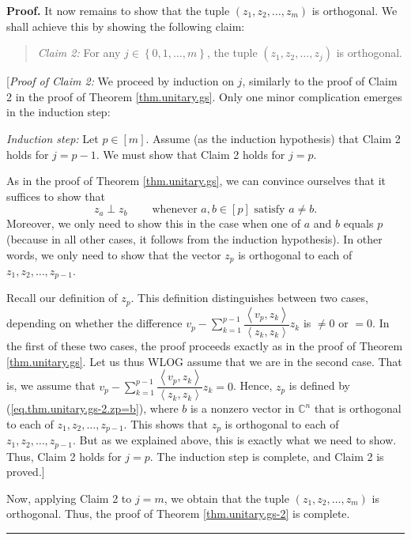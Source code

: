 \documentclass[numbers=enddot,12pt,final,onecolumn,notitlepage]{scrartcl}%
\numberwithin{exer}{subsection}
\theoremstyle{definition}
\newenvironment{statement}{\begin{quote}}{\end{quote}}
\newenvironment{proof}[1][Proof]{\noindent\textbf{#1.} }{\ \rule{0.5em}{0.5em}}
\let\sumnonlimits\sum
\renewcommand{\sum}{\sumnonlimits\limits}
\begin{document}
\begin{proof}
It now remains to show that the tuple $\left(  z_{1},z_{2},\ldots
,z_{m}\right)  $ is orthogonal. We shall achieve this by showing the following claim:

\begin{statement}
\textit{Claim 2:} For any $j\in\left\{  0,1,\ldots,m\right\}  $, the tuple
$\left(  z_{1},z_{2},\ldots,z_{j}\right)  $ is orthogonal.
\end{statement}

[\textit{Proof of Claim 2:} We proceed by induction on $j$, similarly to the
proof of Claim 2 in the proof of Theorem \ref{thm.unitary.gs}. Only one minor
complication emerges in the induction step:

\textit{Induction step:} Let $p\in\left[  m\right]  $. Assume (as the
induction hypothesis) that Claim 2 holds for $j=p-1$. We must show that Claim
2 holds for $j=p$.

As in the proof of Theorem \ref{thm.unitary.gs}, we can convince ourselves
that it suffices to show that
\begin{equation}
z_{a}\perp z_{b}\ \ \ \ \ \ \ \ \ \ \text{whenever }a,b\in\left[  p\right]
\text{ satisfy }a\neq b. \label{pf.thm.unitary.gs-2.13}%
\end{equation}
Moreover, we only need to show this in the case when one of $a$ and $b$ equals
$p$ (because in all other cases, it follows from the induction hypothesis). In
other words, we only need to show that the vector $z_{p}$ is orthogonal to
each of $z_{1},z_{2},\ldots,z_{p-1}$.

Recall our definition of $z_{p}$. This definition distinguishes between two
cases, depending on whether the difference $v_{p}-\sum_{k=1}^{p-1}%
\dfrac{\left\langle v_{p},z_{k}\right\rangle }{\left\langle z_{k}%
,z_{k}\right\rangle }z_{k}$ is $\neq0$ or $=0$. In the first of these two
cases, the proof proceeds exactly as in the proof of Theorem
\ref{thm.unitary.gs}. Let us thus WLOG assume that we are in the second case.
That is, we assume that $v_{p}-\sum_{k=1}^{p-1}\dfrac{\left\langle v_{p}%
,z_{k}\right\rangle }{\left\langle z_{k},z_{k}\right\rangle }z_{k}=0$. Hence,
$z_{p}$ is defined by (\ref{eq.thm.unitary.gs-2.zp=b}), where $b$ is a nonzero
vector in $\mathbb{C}^{n}$ that is orthogonal to each of $z_{1},z_{2}%
,\ldots,z_{p-1}$. This shows that $z_{p}$ is orthogonal to each of
$z_{1},z_{2},\ldots,z_{p-1}$. But as we explained above, this is exactly what
we need to show. Thus, Claim 2 holds for $j=p$. The induction step is
complete, and Claim 2 is proved.]

Now, applying Claim 2 to $j=m$, we obtain that the tuple $\left(  z_{1}%
,z_{2},\ldots,z_{m}\right)  $ is orthogonal. Thus, the proof of Theorem
\ref{thm.unitary.gs-2} is complete.
\end{proof}
\end{document}
